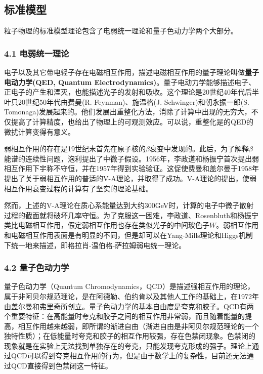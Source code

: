 \subsection{标准模型}
粒子物理的标准模型理论包含了电弱统一理论和量子色动力学两个大部分。

\subsubsection{4.1 电弱统一理论}
电子以及其它带电轻子存在电磁相互作用，描述电磁相互作用的量子理论叫做\textbf{量子电动力学(QED, Quantum Electrodynamics)}。量子电动力学能够描述电子、正电子的产生和湮灭，也能描述光子的发射和吸收。这个理论是20世纪40年代后半叶只20世纪50年代由费曼(R. Feynman)、施温格(J. Schwinger)和朝永振一郎(S. Tomonaga)发展起来的。他们发展出重整化方法，消除了计算中出现的无穷大，不仅提高了计算精度，也给出了物理上的可观测效应。可以说，重整化是的QED的微扰计算变得有意义。

弱相互作用的存在是19世纪末首先在原子核的$\beta$衰变中发现的。此后，为了解释$\beta$能谱的连续性问题，泡利提出了中微子假设。1956年，李政道和杨振宁首次提出弱相互作用下宇称不守恒，并在1957年得到实验验证。这促使费曼和盖尔曼于1958年提出了关于弱相互作用的普适的V-A理论，并取得了成功。V-A理论的提出，使弱相互作用衰变过程的计算有了坚实的理论基础。

然而，上述的V-A理论在质心系能量达到大约300GeV时，计算的电子中微子散射过程的截面就将破坏几率守恒。为了克服这一困难，李政道、Rosenbluth和杨振宁类比电磁相互作用，假定弱相互作用也存在类似光子的中间玻色子$W$。弱相互作用和电磁相互作用表面是有明显的不同，但是却可以在Yang-Mills理论和Higgs机制下统一地来描述，即格拉肖-温伯格-萨拉姆弱电统一理论。

\subsubsection{4.2 量子色动力学}
量子色动力学（Quantum Chromodynamics，QCD）是描述强相互作用的理论，属于非阿贝尔规范理论，是在阿德勒、伯约肯以及其他人工作的基础上，在1972年由盖尔曼和弗里奇所创立。量子色动力学的基本自由度是夸克和胶子。QCD有两个重要特征：在高能量时夸克和胶子之间的相互作用非常弱，而且随着能量的提高，相互作用越来越弱，即所谓的渐进自由（渐进自由是非阿贝尔规范理论的一个独特性质）；在低能量时夸克和胶子的相互作用较强，存在色禁闭现象。色禁闭的现象就是在实验上无法找到单独存在的夸克，只能发现夸克形成的强子。理论上通过QCD可以得到夸克相互作用的行为，但是由于数学上的复杂性，目前还无法通过QCD直接得到色禁闭这一特征。

